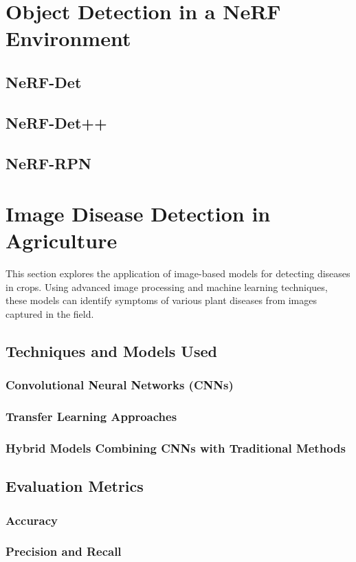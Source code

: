 \documentclass[12pt]{report}
\begin{document}
\chapter{Object Detection in a NeRF Environment}
\section{NeRF-Det}
\section{NeRF-Det++}
\section{NeRF-RPN}

\chapter{Image Disease Detection in Agriculture}
This section explores the application of image-based models for detecting diseases in crops. Using advanced image processing and machine learning techniques, these models can identify symptoms of various plant diseases from images captured in the field.

\section{Techniques and Models Used}
\subsection{Convolutional Neural Networks (CNNs)}
\subsection{Transfer Learning Approaches}
\subsection{Hybrid Models Combining CNNs with Traditional Methods}

\section{Evaluation Metrics}
\subsection{Accuracy}
\subsection{Precision and Recall}
\end{document}
